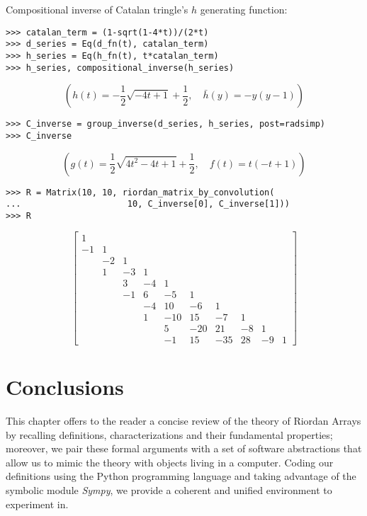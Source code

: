 \begin{example}
Compositional inverse of Catalan tringle's $h$ generating function:
\begin{verbatim}
>>> catalan_term = (1-sqrt(1-4*t))/(2*t)
>>> d_series = Eq(d_fn(t), catalan_term)
>>> h_series = Eq(h_fn(t), t*catalan_term)
>>> h_series, compositional_inverse(h_series)
\end{verbatim}
\begin{displaymath}
\left ( h{\left (t \right )} = - \frac{1}{2} \sqrt{- 4 t + 1} + \frac{1}{2}, \quad \bar{ h }{\left (y \right )} = - y \left(y - 1\right)\right )
\end{displaymath}
\begin{verbatim}
>>> C_inverse = group_inverse(d_series, h_series, post=radsimp)
>>> C_inverse
\end{verbatim}
\begin{displaymath}
\left ( g{\left (t \right )} = \frac{1}{2} \sqrt{4 t^{2} - 4 t + 1} + \frac{1}{2}, \quad f{\left (t \right )} = t \left(- t + 1\right)\right )
\end{displaymath}
\begin{verbatim}
>>> R = Matrix(10, 10, riordan_matrix_by_convolution(
...                     10, C_inverse[0], C_inverse[1]))
>>> R
\end{verbatim}
\begin{displaymath}
\left[\begin{matrix}1 &   &   &   &   &   &   &   &   &  \\-1 & 1 &   &   &   &   &   &   &   &  \\  & -2 & 1 &   &   &   &   &   &   &  \\  & 1 & -3 & 1 &   &   &   &   &   &  \\  &   & 3 & -4 & 1 &   &   &   &   &  \\  &   & -1 & 6 & -5 & 1 &   &   &   &  \\  &   &   & -4 & 10 & -6 & 1 &   &   &  \\  &   &   & 1 & -10 & 15 & -7 & 1 &   &  \\  &   &   &   & 5 & -20 & 21 & -8 & 1 &  \\  &   &   &   & -1 & 15 & -35 & 28 & -9 & 1\end{matrix}\right]
\end{displaymath}
\end{example}

\section*{Conclusions}

This chapter offers to the reader a concise review of the theory of Riordan
Arrays by recalling definitions, characterizations and their fundamental
properties; moreover, we pair these formal arguments with a set of software
abstractions that allow us to mimic the theory with objects living in a
computer. Coding our definitions using the Python programming language and
taking advantage of the symbolic module \textit{Sympy}, we provide a coherent
and unified environment to experiment in.



